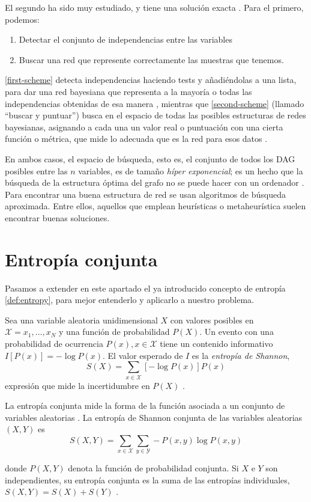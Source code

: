 El segundo ha sido muy estudiado, y tiene una solución exacta \cite{neapolitan}. Para el primero, podemos:
\begin{enumerate}
    \item \label{first-scheme} Detectar el conjunto de independencias entre las variables
    \item \label{second-scheme} Buscar una red que represente correctamente las muestras que tenemos.
\end{enumerate}
    

\ref{first-scheme} detecta independencias haciendo tests y añadiéndolas a una lista, para dar una red 
bayesiana que representa a la mayoría o todas las independencias obtenidas de esa manera \cite{learning-algorithms-BN-comparison}, 
mientras que \ref{second-scheme} (llamado ``buscar y puntuar'') busca en el espacio de todas las posibles estructuras 
de redes bayesianas, asignando a cada una un valor real o puntuación con una cierta función o métrica, que mide lo 
adecuada que es la red para esos datos \cite{more-algorithms}.

En ambos casos, el espacio de búsqueda, esto es, el conjunto de todos los DAG posibles entre las $n$ variables, 
es de tamaño {\em híper exponencial}; es un hecho que la búsqueda de la estructura óptima del grafo no se puede 
hacer con un ordenador \cite{Chickering}. Para encontrar una buena estructura de red se usan algoritmos de búsqueda 
aproximada. Entre ellos, aquellos que emplean heurísticas o metaheurística suelen encontrar buenas soluciones. 

\section{Entropía conjunta}
Pasamos a extender en este apartado el ya introducido concepto de entropía \ref{def:entropy}, para mejor 
entenderlo y aplicarlo a nuestro problema.

Sea una variable aleatoria unidimensional $X$ con valores posibles en $\mathcal{X}={x_{1},\dots,x_{N}}$ y una 
función de probabilidad $P(X)$. Un evento con una probabilidad de ocurrencia $P(x), x \in \mathcal{X}$ tiene 
un contenido informativo $I[P(x)]=- \log P(x)$. El valor esperado de $I$ es la {\em entropía de Shannon}, 
$$S(X)= \sum_{x \in \mathcal{X}} [- \log P(x)]P(x)$$
expresión que mide la incertidumbre en $P(X)$ \cite{entropy-extended}.

La entropía conjunta mide la forma de la función asociada a un conjunto de variables aleatorias \cite{mass-function}.
La entropía de Shannon conjunta de las variables aleatorias $(X,Y)$ es 
$$S(X,Y)= \sum_{x \in \mathcal{X}} \sum_{y \in \mathcal{Y}} - P(x,y) \log P(x,y) $$

donde $P(X,Y)$ denota la función de probabilidad conjunta. Si $X$ e $Y$ son independientes, su entropía conjunta es la suma 
de las entropías individuales, $S(X,Y)=S(X)+S(Y)$ \cite{entropy-extended}.
